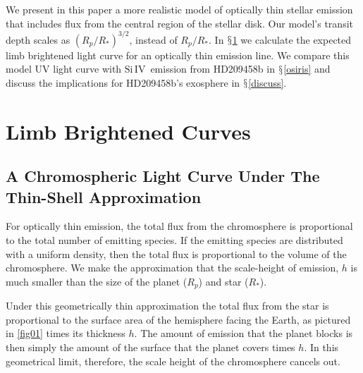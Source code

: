 \documentclass[manuscript]{aastex}
\newcommand{\siIV}{\ensuremath{\mathrm{Si}\,\scriptstyle \mathrm{IV}}}
\begin{document}
We present in this paper a more realistic model of optically thin stellar emission that includes flux from the central region of the stellar disk. Our model's transit depth scales as $(R_p/R_*)^{3/2}$, instead of $R_p/R_*$. In
$\mathsection$\ref{labl:chromlcurve} we calculate the expected limb
brightened light curve for an optically thin emission line. We
compare this model UV light curve with \siIV\ emission from HD209458b in  $\mathsection$\ref{osiris} and discuss the implications for HD209458b's exosphere in $\mathsection$\ref{discuss}.

\section{Limb Brightened Curves} \label{labl:chromlcurve}

\subsection{A Chromospheric Light Curve Under The Thin-Shell Approximation}
\label{labl:thinshell}

For optically thin emission, the total flux from the chromosphere is proportional to the total number of emitting species. If the emitting species are distributed with a uniform density, then the total flux is proportional to the volume of the chromosphere. We make the approximation that the scale-height of emission, $h$ is much smaller than the size of the planet ($R_p$) and star ($R_*$).

Under this geometrically thin approximation the total flux from the star is proportional to the surface area of the hemisphere facing the Earth, as pictured in \ref{fig01} times its thickness $h$. The amount of emission that the planet blocks is then simply the amount of the surface that the planet covers times $h$. In this geometrical limit, therefore, the scale height of the chromosphere cancels out.


\end{document}
